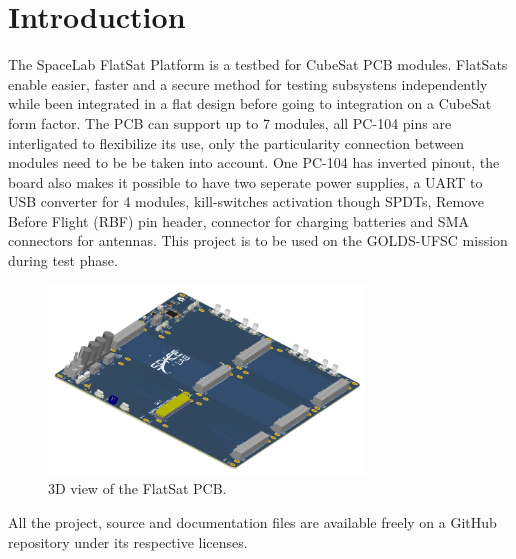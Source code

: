 %
%
%
%
%

%
%
%
%
%
%

\chapter{Introduction} \label{ch:introduction}

The SpaceLab FlatSat Platform is a testbed for CubeSat PCB modules. FlatSats enable easier, faster and a secure method for testing subsystens independently while been integrated in a flat design before going to integration on a CubeSat form factor. The PCB can support up to 7 modules, all PC-104 pins are interligated to flexibilize its use, only the particularity connection between modules need to be be taken into account. One PC-104 has inverted pinout, the board also makes it possible to have two seperate power supplies, a UART to USB converter for 4 modules, kill-switches activation though SPDTs, Remove Before Flight (RBF) pin header, connector for charging batteries and SMA connectors for antennas. This project is to be used on the GOLDS-UFSC mission \cite{golds-ufsc} during test phase.

\begin{figure}[!ht]
    \begin{center}
        \includegraphics[width=0.75\textwidth]{figures/flatsat_perspective_image.png}
        \caption{3D view of the FlatSat PCB.}
        \label{fig:pcb-3d}
    \end{center}
\end{figure}

All the project, source and documentation files are available freely on a GitHub repository \cite{flatsat-platform-repo} under its respective licenses.
